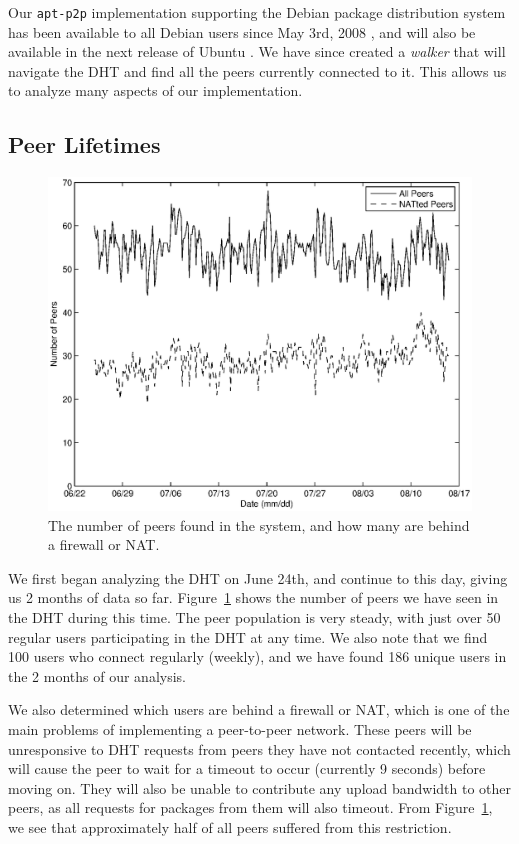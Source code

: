 \documentclass[conference]{IEEEtran}
\begin{document}
Our \texttt{apt-p2p} implementation supporting the Debian package
distribution system has been available to all Debian users since May
3rd, 2008 \cite{apt-p2p-debian}, and will also be available in the
next release of Ubuntu \cite{apt-p2p-ubuntu}. We have since created
a \emph{walker} that will navigate the DHT and find all the peers
currently connected to it. This allows us to analyze many aspects of
our implementation.

\subsection{Peer Lifetimes}
\label{peer_life}

\begin{figure}
\centering
\includegraphics[width=\columnwidth]{AptP2PWalker-peers.eps}
\caption{The number of peers found in the system, and how many are
behind a firewall or NAT.}
\label{walker_peers}
\end{figure}

We first began analyzing the DHT on June 24th, and continue to this
day, giving us 2 months of data so far. Figure~\ref{walker_peers}
shows the number of peers we have seen in the DHT during this time.
The peer population is very steady, with just over 50 regular users
participating in the DHT at any time. We also note that we find 100
users who connect regularly (weekly), and we have found 186 unique
users in the 2 months of our analysis.

We also determined which users are
behind a firewall or NAT, which is one of the main problems of
implementing a peer-to-peer network. These peers will be
unresponsive to DHT requests from peers they have not contacted
recently, which will cause the peer to wait for a timeout to occur
(currently 9 seconds) before moving on. They will also be
unable to contribute any upload bandwidth to other peers, as all
requests for packages from them will also timeout. From
Figure~\ref{walker_peers}, we see that approximately half of all
peers suffered from this restriction.
\end{document}
